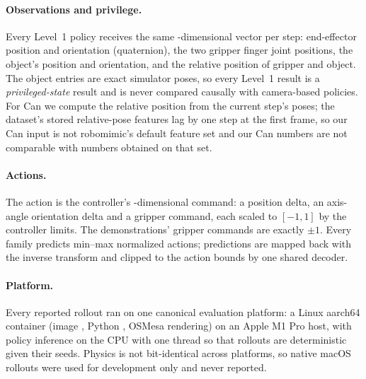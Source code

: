 \paragraph{Observations and privilege.} Every Level~1 policy receives the same
-dimensional vector per step: end-effector position and orientation
(quaternion), the two gripper finger joint positions, the object's position and orientation,
and the relative position of gripper and object. The object entries are exact simulator
poses, so every Level~1 result is a \emph{privileged-state} result and is never compared
causally with camera-based policies. For Can we compute the relative position from the
current step's poses; the dataset's stored relative-pose features lag by one step at the
first frame, so our Can input is not robomimic's default feature set and our Can numbers are
not comparable with numbers obtained on that set.

\paragraph{Actions.} The action is the controller's -dimensional command: a
position delta, an axis-angle orientation delta and a gripper command, each scaled to
$[-1, 1]$ by the controller limits. The demonstrations' gripper commands are exactly
$\pm 1$. Every family predicts min--max normalized actions; predictions are mapped back with
the inverse transform and clipped to the action bounds by one shared decoder.

\paragraph{Platform.} Every reported rollout ran on one canonical evaluation platform: a
Linux aarch64 container (image , Python , OSMesa
rendering) on an Apple M1 Pro host, with policy inference on the CPU with one thread so that
rollouts are deterministic given their seeds. Physics is not bit-identical across platforms,
so native macOS rollouts were used for development only and never reported.
